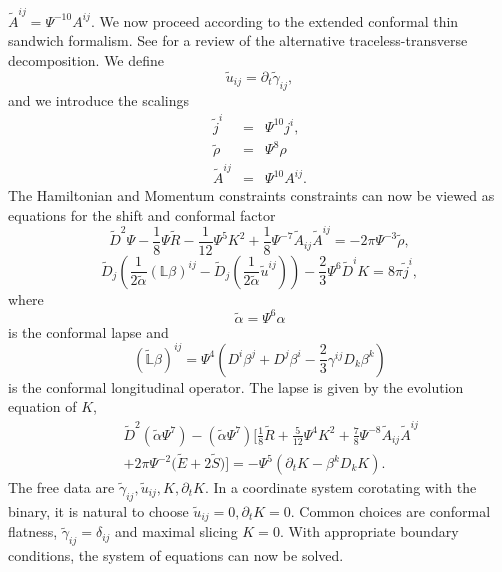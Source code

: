 $\tilde{A}^{ij}=\Psi^{-10}A^{ij}$. We now proceed according to the extended conformal thin sandwich formalism. See  for a review of the alternative traceless-transverse decomposition. We define 
\begin{equation}
\tilde{u}_{ij}=\partial_t\tilde{\gamma}_{ij},
\end{equation}
and we introduce the scalings
\begin{eqnarray}
\tilde{j}^i &=& \Psi^{10}j^i, \\
\tilde{\rho} &=& \Psi^{8}\rho \\
\tilde{A}^{ij} &=& \Psi^{10} A^{ij}. 
\end{eqnarray}
The Hamiltonian and Momentum constraints constraints can now be viewed as equations for the shift and conformal factor
\begin{equation}
\tilde{D}^2\Psi-\frac{1}{8}\Psi\tilde{R}-\frac{1}{12}\Psi^5K^2+\frac{1}{8}\Psi^{-7}\tilde{A}_{ij}\tilde{A}^{ij}=-2\pi\Psi^{-3}\tilde{\rho},
\end{equation}
\begin{equation}
\tilde{D}_j\left(\frac{1}{2\tilde{\alpha}}\left(\mathbb{L}\beta\right)^{ij}-\tilde{D}_j\left(\frac{1}{2\tilde{\alpha}}\tilde{u}^{ij}\right)\right)-\frac{2}{3}\Psi^6\tilde{D}^iK=8\pi\tilde{j}^i,
\end{equation}
where
\begin{equation}
\tilde{\alpha}=\Psi^6\alpha
\end{equation}
is the conformal lapse and 
\begin{equation}
\left(\tilde{\mathbb{L}}\beta\right)^{ij}=\Psi^4\left(D^i\beta^j+D^j\beta^i-\frac{2}{3}\gamma^{ij}D_k\beta^k\right)
\end{equation}
is the conformal longitudinal operator. The lapse is given by the evolution equation of $K$,
\begin{eqnarray}
&&\tilde{D}^2\left(\tilde{\alpha}\Psi^7\right) -
\left(\tilde{\alpha}\Psi^7\right)\bigg[\frac{1}{8}\tilde{R}+\frac{5}{12}\Psi^4K^2+\frac{7}{8}\Psi^{-8}\tilde{A}_{ij}\tilde{A}^{ij}\nonumber \\
\label{eq:XCTS-Lapse}
&&+2\pi\Psi^{-2}\big(\tilde{E}+2\tilde{S}\big)\bigg]=-\Psi^5\left(\partial_{t}K
- \beta^{k}D_kK\right).
\end{eqnarray}
The free data are $\tilde{\gamma}_{ij},\tilde{u}_{ij},K,\partial_tK$. In a coordinate system corotating with the binary, it is natural to choose $\tilde{u}_{ij}=0, \partial_tK=0$. Common choices are conformal flatness, $\tilde{\gamma}_{ij}=\delta_{ij}$ and maximal slicing $K=0$. With appropriate boundary conditions, the system of equations can now be solved.

